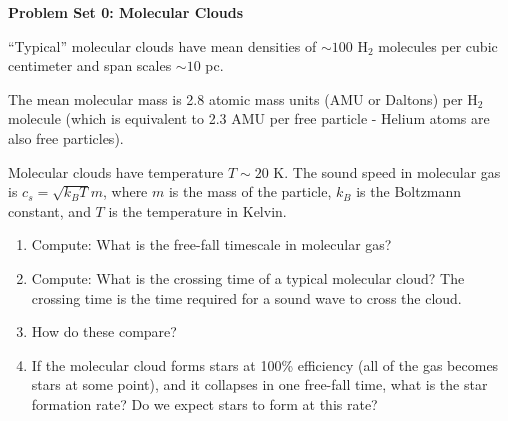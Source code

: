 \documentclass[twoside]{tufte-book} %
\begin{document}
\noindent\textbf{Problem Set 0: Molecular Clouds}

``Typical'' molecular clouds have mean densities of $\sim100$ H$_2$ molecules per
cubic centimeter and span scales $\sim10$ pc.

The mean molecular mass is 2.8 atomic mass units (AMU or Daltons) per H$_2$
molecule (which is equivalent to 2.3 AMU per free particle - Helium atoms are
also free particles).

Molecular clouds have temperature $T\sim20$ K.
The sound speed in molecular gas is $c_s = \sqrt{k_B T}{m}$, where $m$ is the
mass of the particle, $k_B$ is the Boltzmann constant, and $T$ is the
temperature in Kelvin.

\begin{enumerate}
    \item Compute: What is the free-fall timescale in molecular gas?
    \item Compute: What is the crossing time of a typical molecular cloud?  The
        crossing time is the time required for a sound wave to cross the cloud.
    \item How do these compare?
    \item If the molecular cloud forms stars at 100\% efficiency (all of the
        gas becomes stars at some point), and it collapses in one free-fall
        time, what is the star formation rate?
        Do we expect stars to form at this rate?
\end{enumerate}
\end{document}
